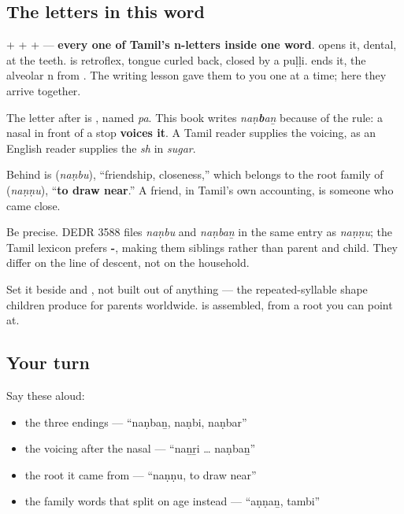 \subsection*{The letters in this word}
\textbf{} + \textbf{} + \textbf{} + \textbf{} — \textbf{every one of Tamil's n-letters inside one word}. \textbf{} opens it, dental, at the teeth. \textbf{} is retroflex, tongue curled back, closed by a puḷḷi. \textbf{} ends it, the alveolar n from \textbf{}. The writing lesson gave them to you one at a time; here they arrive together.

\begin{sounds}
The letter after \textbf{} is \textbf{}, named \emph{pa}. This book writes \emph{naṇ\textbf{b}aṉ} because of the \textbf{} rule: a nasal in front of a stop \textbf{voices it}. A Tamil reader supplies the voicing, as an English reader supplies the \emph{sh} in \emph{sugar}.
\end{sounds}

\begin{cousinweb}
Behind \textbf{} is \textbf{} (\emph{naṇbu}), \textquotedblleft{}friendship, closeness,\textquotedblright{} which belongs to the root family of \textbf{} (\emph{naṇṇu}), \textquotedblleft{}\textbf{to draw near}.\textquotedblright{} A friend, in Tamil's own accounting, is someone who came close.

Be precise. DEDR 3588 files \emph{naṇbu} and \emph{naṇbaṉ} in the same entry as \emph{naṇṇu}; the Tamil lexicon prefers \textbf{-}, making them siblings rather than parent and child. They differ on the line of descent, not on the household.

Set it beside \textbf{} and \textbf{}, not built out of anything — the repeated-syllable shape children produce for parents worldwide. \textbf{} is assembled, from a root you can point at.
\end{cousinweb}

\subsection*{Your turn}
Say these aloud:

\begin{itemize}
\raggedright
  \item the three endings — \textquotedblleft{}naṇbaṉ, naṇbi, naṇbar\textquotedblright{}
  \item the voicing after the nasal — \textquotedblleft{}naṉṟi … naṇbaṉ\textquotedblright{}
  \item the root it came from — \textquotedblleft{}naṇṇu, to draw near\textquotedblright{}
  \item the family words that split on age instead — \textquotedblleft{}aṇṇaṉ, tambi\textquotedblright{}
\end{itemize}


